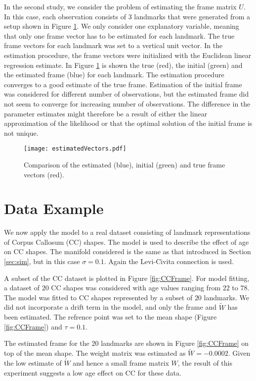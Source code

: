 \documentclass[runningheads,a4paper]{llncs}
\begin{document}
In the second study, we consider the problem of estimating the frame matrix $U$. In this case, each observation consists of 3 landmarks that were generated from a setup shown in Figure \ref{fig:Vec}. We only consider one explanatory variable, meaning that only one frame vector has to be estimated for each landmark. The true frame vectors for each landmark was set to a vertical unit vector. In the estimation procedure, the frame vectors were initialized with the Euclidean linear regression estimate. In Figure \ref{fig:Vec} is shown the true (red), the initial (green) and the estimated frame (blue) for each landmark. The estimation procedure converges to a good estimate of the true frame. Estimation of the initial frame was considered for different number of observations, but the estimated frame did not seem to converge for increasing number of observations. The difference in the parameter estimates might therefore be a result of either the linear approximation of the likelihood or that the optimal solution of the initial frame is not unique.

\begin{figure}
\centering
\texttt{[image: estimatedVectors.pdf]}
\caption{Comparison of the estimated (blue), initial (green) and true frame vectors (red).}
\label{fig:Vec}
\end{figure}

\section{Data Example}
\label{sec:datEx}

We now apply the model to a real dataset consisting of landmark representations of Corpus Callosum (CC) shapes. The model is used to describe the effect of age on CC shapes. The manifold considered is the same as that introduced in Section \ref{sec:sim}, but in this case $\sigma = 0.1$. Again the Levi-Civita connection is used.

 A subset of the CC dataset is plotted in Figure \ref{fig:CCFrame}. For model fitting, a dataset of $20$ CC shapes was considered with age values ranging from $22$ to $78$. The model was fitted to CC shapes represented by a subset of $20$ landmarks. We did not incorporate a drift term in the model, and only the frame and $\tilde{W}$ has been estimated. The refrence point was set to the mean shape (Figure \ref{fig:CCFrame}) and $\tau = 0.1$.

 The estimated frame for the $20$ landmarks are shown in Figure \ref{fig:CCFrame} on top of the mean shape. The weight matrix was estimated as $\tilde{W} = -0.0002$. Given the low estimate of $\tilde{W}$ and hence a small frame matrix $W$, the result of this experiment suggests a low age effect on CC for these data.  
\end{document}

